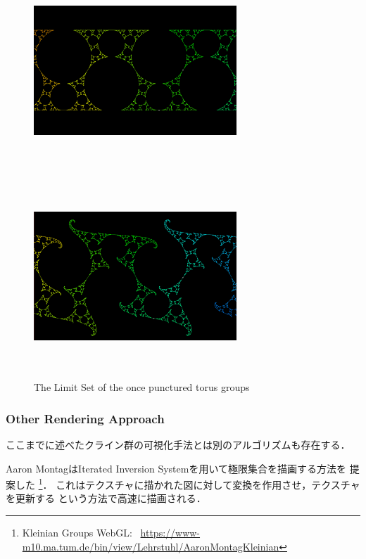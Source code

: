  \begin{figure}[htbp]
  \begin{minipage}{0.5\hsize}
   \center
   \includegraphics[width=3in, height=3in,
   keepaspectratio]{../img/klein/opt1N.pdf}
   \subcaption{}
  \end{minipage}
  \begin{minipage}{0.5\hsize}
   \center
   \includegraphics[width=3in, height=3in,
   keepaspectratio]{../img/klein/opt2N.pdf}
   \subcaption{}
  \end{minipage}
  \caption{The Limit Set of the once punctured torus groups}
  \label{fig:opt}
 \end{figure}

\subsubsection{Other Rendering Approach}

ここまでに述べたクライン群の可視化手法とは別のアルゴリズムも存在する．

Aaron MontagはIterated Inversion Systemを用いて極限集合を描画する方法を
提案した\cite{Montag2014hyperbolicIFS}
\footnote{Kleinian Groups WebGL:
~\url{https://www-m10.ma.tum.de/bin/view/Lehrstuhl/AaronMontagKleinian}}．
これはテクスチャに描かれた図に対して変換を作用させ，テクスチャを更新する
という方法で高速に描画される．

